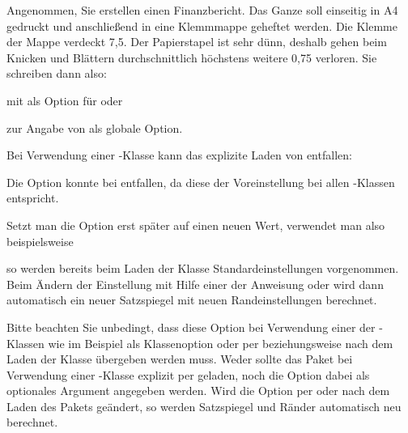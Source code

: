 \begin{Example}
  Angenommen, Sie erstellen einen Finanzbericht. Das Ganze soll
  einseitig in A4 gedruckt und anschließend in eine Klemmmappe
  geheftet werden. Die Klemme der Mappe verdeckt 7,5.
  Der Papierstapel ist sehr dünn, deshalb gehen beim Knicken und
  Blättern durchschnittlich höchstens weitere 0,75
  verloren. Sie schreiben dann also:
  mit  als Option für  oder
  zur Angabe von  als globale Option.

  Bei Verwendung einer \KOMAScript-Klasse kann das explizite Laden von
   entfallen:
  Die Option  konnte bei  entfallen, da diese
  der Voreinstellung bei allen \KOMAScript-Klassen entspricht.

  Setzt man die Option erst später auf einen neuen Wert, verwendet man also
  beispielsweise
  so werden bereits beim Laden der Klasse 
  Standardeinstellungen vorgenommen. Beim Ändern der Einstellung mit Hilfe
  einer der Anweisung  oder
   wird dann automatisch ein neuer
  Satzspiegel mit neuen Randeinstellungen berechnet.
\end{Example}

Bitte beachten Sie unbedingt, dass diese Option bei
Verwendung einer der \KOMAScript-Klassen wie im Beispiel als Klassenoption
oder per  beziehungsweise
 nach dem Laden der Klasse übergeben werden
muss. Weder sollte das Paket  bei Verwendung einer
\KOMAScript-Klasse explizit per  geladen,
noch die Option dabei als optionales Argument angegeben
werden. Wird die Option per
 oder 
nach dem Laden des Pakets geändert, so werden Satzspiegel und Ränder
automatisch neu berechnet.%
%
\EndIndexGroup


